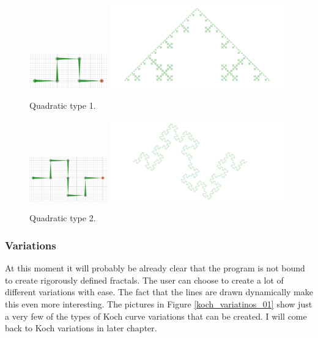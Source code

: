             \begin{figure}[ht]
                \caption{\label{quadratic_01} Quadratic type 1.}
                \centering
                \includegraphics[width=0.3\textwidth]{img/quadratic_01setup.png}
                \includegraphics[width=0.67\textwidth]{img/quadratic_01draw.png}
            \end{figure}

            \begin{figure}[ht]
                \caption{\label{quadratic_02} Quadratic type 2.}
                \centering
                \includegraphics[width=0.3\textwidth]{img/quadratic_02setup.png}
                \includegraphics[width=0.67\textwidth]{img/quadratic_02draw.png}
            \end{figure}

            \FloatBarrier

        \subsubsection{Variations}

            At this moment it will probably be already clear that the program is not bound to create rigorously defined fractals. 
            The user can choose to create a lot of different variations with ease.
            The fact that the lines are drawn dynamically make this even more interesting.
            The pictures in Figure \ref{koch_variatinos_01} show just a very few of the types of Koch curve variations that can be created.
            I will come back to Koch variations in later chapter.

